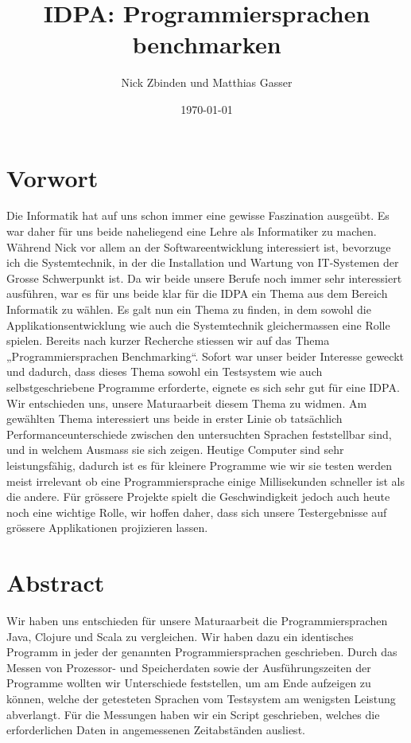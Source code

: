 \documentclass{fancydocument}
\title{IDPA: Programmiersprachen benchmarken}
\author{Nick Zbinden und Matthias Gasser}
\date{\today}
\begin{document}
\maketitle
\thispagestyle{fancy}

\section{Vorwort}
Die Informatik hat auf uns schon immer eine gewisse Faszination ausgeübt. Es war daher für uns beide naheliegend eine Lehre als Informatiker zu machen. Während Nick vor allem an der Softwareentwicklung interessiert ist, bevorzuge ich die Systemtechnik, in der die Installation und Wartung von IT-Systemen der Grosse Schwerpunkt ist.
Da wir beide unsere Berufe noch immer sehr interessiert ausführen, war es für uns beide klar für die IDPA ein Thema aus dem Bereich Informatik zu wählen. Es galt nun ein Thema zu finden, in dem sowohl die Applikationsentwicklung wie auch die Systemtechnik gleichermassen eine Rolle spielen. Bereits nach kurzer Recherche stiessen wir auf das Thema „Programmiersprachen Benchmarking“. Sofort war unser beider Interesse geweckt und dadurch,  dass dieses Thema sowohl ein Testsystem wie auch selbstgeschriebene Programme erforderte, eignete es sich sehr gut für eine IDPA. Wir entschieden uns, unsere Maturaarbeit diesem Thema zu widmen.
Am gewählten Thema interessiert uns beide in erster Linie ob tatsächlich Performanceunterschiede zwischen den untersuchten Sprachen feststellbar sind, und in welchem Ausmass sie sich zeigen. Heutige Computer sind sehr leistungsfähig, dadurch ist es für kleinere Programme wie wir sie testen werden meist irrelevant ob eine Programmiersprache einige Millisekunden schneller ist als die andere. Für grössere Projekte spielt die Geschwindigkeit jedoch auch heute noch eine wichtige Rolle, wir hoffen daher, dass sich unsere Testergebnisse auf grössere Applikationen projizieren lassen.

\section{Abstract}
Wir haben uns entschieden für unsere Maturaarbeit die Programmiersprachen Java, Clojure und Scala zu vergleichen. Wir haben dazu ein identisches Programm in jeder der genannten Programmiersprachen geschrieben. Durch das Messen von Prozessor- und Speicherdaten sowie der Ausführungszeiten der Programme wollten wir Unterschiede feststellen, um am Ende aufzeigen zu können, welche der getesteten Sprachen vom Testsystem am wenigsten Leistung abverlangt. Für die Messungen haben wir ein Script geschrieben, welches die erforderlichen Daten in angemessenen Zeitabständen ausliest. 
\end{document}
